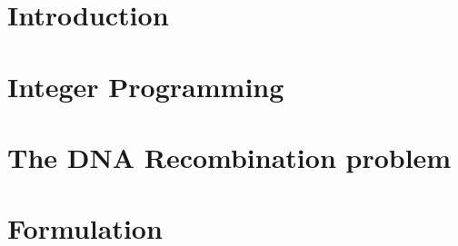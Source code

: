 \documentclass[12pt,a4paper]{report}
\begin{document}



\tableofcontents
\thispagestyle{empty}

\chapter{Introduction}


\chapter{Integer Programming}


\chapter{The DNA Recombination problem}


\chapter{Formulation}




\end{document}
